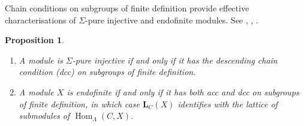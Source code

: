 \documentclass[a4paper]{amsart}
\theoremstyle{plain}
\newtheorem{prop}[thm]{Proposition}
\theoremstyle{definition}
\theoremstyle{remark}
\numberwithin{equation}{section}
\newcommand{\Hom}{\operatorname{Hom}}
\def\bfL{\mathbf L}
\def\bfL{\mathbf L}
\begin{document}
Chain conditions on subgroups of finite definition provide effective characterisations of $\Sigma$-pure injective and endofinite modules. See \cite{GrusonJensen}, \cite{Z}, \cite[Theorem~3.1 and Proposition~4.1]{CB1992}.

\begin{prop}\label{pr:subgroup-fin-def}
\begin{enumerate}
\item A module is $\Sigma$-pure injective if and only if it has the descending chain condition (dcc) on subgroups of finite definition.
\item A module $X$ is endofinite if and only if it has both acc and dcc on subgroups of finite definition, in which case $\bfL_C(X)$ identifies with the lattice of submodules of $\Hom_\Lambda(C,X)$.
\end{enumerate}
\end{prop}
\end{document}
